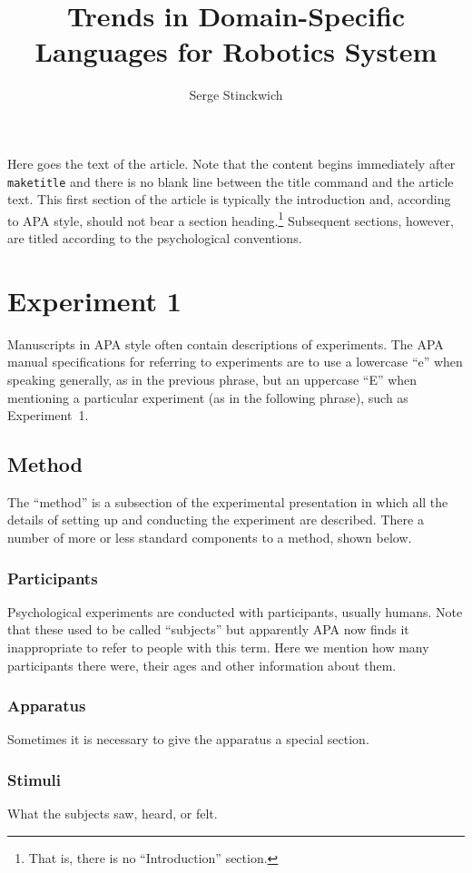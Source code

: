 \documentclass[man]{apa}
\title{Trends in Domain-Specific Languages for Robotics System}
\author{Serge Stinckwich}
\affiliation{Institute for Language \& Speech Processing\\ Athens, Greece}
\begin{document}
\maketitle                            
Here goes the text of the article. Note that the content begins immediately after \texttt{maketitle} and there is no blank line between the title command and the article text. This first section of the article is typically the introduction and, according to APA style, should not bear a section heading.\footnote{That is, there is no ``Introduction'' section.} Subsequent sections, however, are titled according to the psychological conventions.

\section{Experiment 1} 
Manuscripts in APA style often contain descriptions of experiments.  The APA manual specifications for referring to experiments are to use a lowercase ``e'' when speaking generally, as in the previous phrase, but an uppercase ``E'' when mentioning a particular experiment (as in the following phrase), such as Experiment~1.

\subsection{Method}
The ``method'' is a subsection of the experimental presentation in which all the details of setting up and conducting the experiment are described.  There a number of more or less standard components to a method, shown below.
\subsubsection{Participants}
Psychological experiments are conducted with participants, usually humans. Note that these used to be called ``subjects'' but apparently APA now finds it inappropriate to refer to people with this term.  Here we mention how many participants there were, their ages and other information about them.
\subsubsection{Apparatus}
Sometimes it is necessary to give the apparatus a special section.
\subsubsection{Stimuli}
What the subjects saw, heard, or felt.
\end{document}
